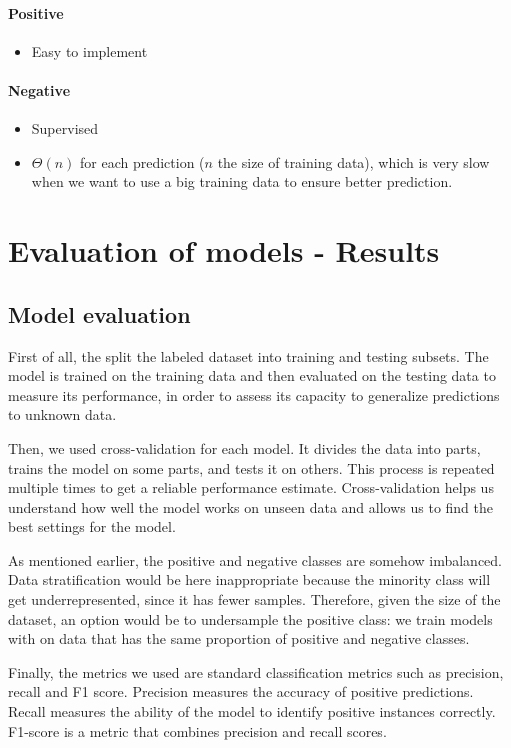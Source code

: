 \documentclass{article}
\begin{document}
\paragraph{Positive} \begin{itemize}
  \item Easy to implement
\end{itemize}

\paragraph{Negative} \begin{itemize}
  \item Supervised
  \item $\Theta(n)$ for each prediction ($n$ the size of training data), which is
  very slow when we want to use a big training data to ensure better prediction.
\end{itemize}

\section{Evaluation of models - Results}

\subsection{Model evaluation}

First of all, the split the labeled dataset into training and testing subsets. The model is trained on the training data and then evaluated on the testing data to measure its performance, in order to assess its capacity to generalize predictions to unknown data.

Then, we used cross-validation for each model. It divides the data into parts, trains the model on some parts, and tests it on others. This process is repeated multiple times to get a reliable performance estimate. Cross-validation helps us understand how well the model works on unseen data and allows us to find the best settings for the model.

As mentioned earlier, the positive and negative classes are somehow imbalanced. Data stratification would be here inappropriate because the minority class will get underrepresented, since it has fewer samples.
Therefore, given the size of the dataset, an option would be to undersample the positive class: we train models with on data that has the same proportion of positive and negative classes.

Finally, the metrics we used are standard classification metrics such as precision, recall and F1 score.
Precision measures the accuracy of positive predictions. Recall measures the ability of the model to identify positive instances correctly. F1-score is a metric that combines precision and recall scores.
\end{document}
